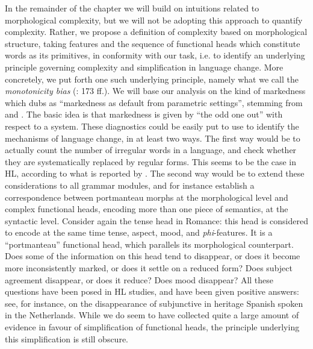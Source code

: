 \documentclass[output=paper]{langscibook}
\begin{document}
In the remainder of the chapter we will build on intuitions related to morphological complexity, but we will not be adopting this approach to quantify complexity. Rather, we propose a definition of complexity based on morphological structure, taking features and the sequence of functional heads which constitute words as its primitives, in conformity with our task, i.e. to identify an underlying principle governing complexity and simplification in language change. More concretely, we put forth one such underlying principle, namely what we call the \textit{monotonicity bias} (\citealt{Terenghi2021LAGB, Terenghi2022Sinf15, Terenghi2023}: 173 ff.). We will base our analysis on the kind of markedness which \citet{Haspelmath2006} dubs as ``markedness as default from parametric settings'', stemming from \citet[Ch. 9]{ChomskyHalle1968} and \citet{Kean1975}. The basic idea is that markedness is given by ``the odd one out'' with respect to a system.
These diagnostics could be easily put to use to identify the mechanisms of language change, in at least two ways. The first way would be to actually count the number of irregular words in a language, and check whether they are systematically replaced by regular forms. This seems to be the case in HL, according to what is reported by \citet{AalberseMuysken2019}. The second way would be to extend these considerations to all grammar modules, and for instance establish a correspondence between portmanteau morphs at the morphological level and complex functional heads, encoding more than one piece of semantics, at the syntactic level. Consider again the tense head in Romance: this head is considered to encode at the same time tense, aspect, mood, and \textit{phi}-features. It is a ``portmanteau'' functional head, which parallels its morphological counterpart. Does some of the information on this head tend to disappear, or does it become more inconsistently marked, or does it settle on a reduced form? Does subject agreement disappear, or does it reduce? Does mood disappear? All these questions have been posed in HL studies, and have been given positive answers: see, for instance, \citet{vanOschSleeman2018Spanish} on the disappearance of subjunctive in heritage Spanish spoken in the Netherlands. While we do seem to have collected quite a large amount of evidence in favour of simplification of functional heads, the principle underlying this simplification is still obscure. 
\end{document}
